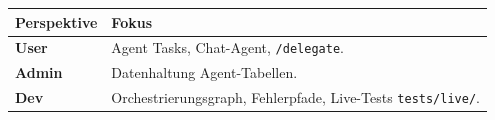 \begin{center}
\begin{tabular}{ll}
\hline
Perspektive & Fokus \\
\hline
\textbf{User} & Agent Tasks, Chat-Agent, \texttt{/delegate}. \\
\textbf{Admin} & Datenhaltung Agent-Tabellen. \\
\textbf{Dev} & Orchestrierungsgraph, Fehlerpfade, Live-Tests \texttt{tests/live/}. \\
\hline
\end{tabular}
\end{center}

